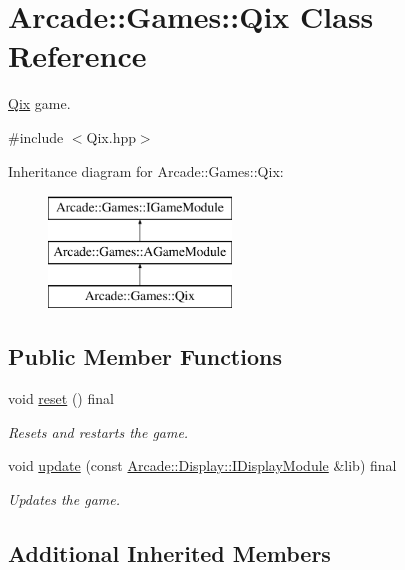 \hypertarget{classArcade_1_1Games_1_1Qix}{}\section{Arcade\+::Games\+::Qix Class Reference}
\label{classArcade_1_1Games_1_1Qix}


\mbox{\hyperlink{classArcade_1_1Games_1_1Qix}{Qix}} game.  




{\ttfamily \#include $<$Qix.\+hpp$>$}

Inheritance diagram for Arcade\+::Games\+::Qix\+:\begin{figure}[H]
\begin{center}
\leavevmode
\includegraphics[height=3.000000cm]{classArcade_1_1Games_1_1Qix}
\end{center}
\end{figure}
\subsection*{Public Member Functions}
\begin{DoxyCompactItemize}
\item 
\mbox{\label{classArcade_1_1Games_1_1Qix_a7d3a6ced1c867ee297a5777db3ff1e12}} 
void \mbox{\hyperlink{classArcade_1_1Games_1_1Qix_a7d3a6ced1c867ee297a5777db3ff1e12}{reset}} () final
\begin{DoxyCompactList}\small\item\em Resets and restarts the game. \end{DoxyCompactList}\item 
void \mbox{\hyperlink{classArcade_1_1Games_1_1Qix_aab6bfb0ecf8571da19c4fcbfc9de263e}{update}} (const \mbox{\hyperlink{classArcade_1_1Display_1_1IDisplayModule}{Arcade\+::\+Display\+::\+I\+Display\+Module}} \&lib) final
\begin{DoxyCompactList}\small\item\em Updates the game. \end{DoxyCompactList}\end{DoxyCompactItemize}
\subsection*{Additional Inherited Members}


